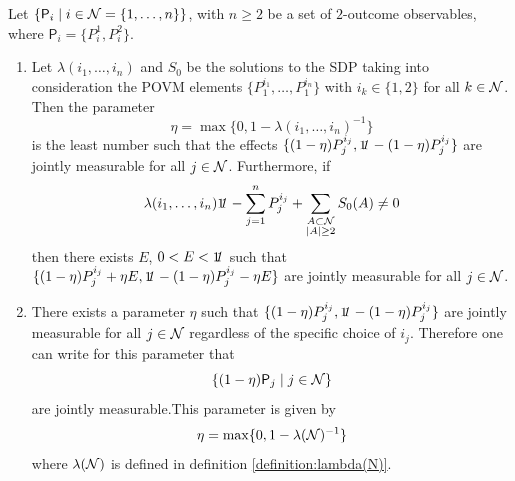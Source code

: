 \documentclass[10pt, a4paper]{amsart}
\begin{document}
\begin{proposition}\label{prop:whole_noise_proposition}
Let $\{\mathsf{P}_{i}\mid i\in \mathcal{N} =  \{1, \ldots ,n\}\}$, with $n\geq 2$ be a set of $2$-outcome observables, where $\mathsf{P}_{i} = \{P_{i}^{1}, P_{i}^{2}\}$.
\begin{enumerate}
\item Let $\lambda(i_{1}, \ldots, i_{n}) $ and $S_{0}$ be the solutions to the SDP taking into consideration the POVM elements $\{P_{1}^{i_{1}}, \ldots , P_{1}^{i_{n}}\}$ with $i_{k}\in\{1,2\}$ for all $k\in\mathcal{N}$. Then 
the parameter 
$$
\eta  = \max\{0 , 1- \lambda(i_{1}, \ldots , i_{n})^{-1}\}
$$
is the least number such that the effects $\{(1-\eta)P_{j}^{i_{j}} , \mathit{\bbone} - (1-\eta)P_{j}^{i_{j}}\}$ are jointly measurable for all $j\in\mathcal{N}$. Furthermore, if 
\begin{equation}\label{eq:proof:refinement_n_neq}
\lambda(i_{1}, \ldots , i_{n}) \mathit{\bbone} - \sum_{j=1}^{n}P_{j}^{i_{j}} +\sum_{\substack{A\subset \N\\ |A|\geq 2}}S_{0}(A)\neq 0
\end{equation}
then there exists $E$,  $0< E <\mathit{\bbone}$ such that $\{(1-\eta)P_{j}^{i_{j}} + \eta E , \mathit{\bbone} - (1-\eta)P_{j}^{i_{j}} - \eta E\}$ are jointly measurable for all $j\in\mathcal{N}$. 
\item There exists a parameter $\eta $ such that $\{(1-\eta)P_{j}^{i_{j}}, \mathit{\bbone}- (1-\eta) P_{j}^{i_{j}}\}$  are jointly measurable for all $j\in \mathcal{N}$ regardless of the specific choice of $i_{j}$. Therefore one can write for this parameter that
$$
\{(1-\eta)\mathsf{P}_{j} \mid j\in \mathcal{N}\}
$$  
are jointly measurable.This parameter is given by 
$$
\eta = \max\{0 , 1 - \lambda(\mathcal{N})^{-1}\}
$$
where $\lambda (\mathcal{N})$ is defined in definition \ref{definition:lambda(N)}. 
\end{enumerate}
\end{proposition}
\end{document}
